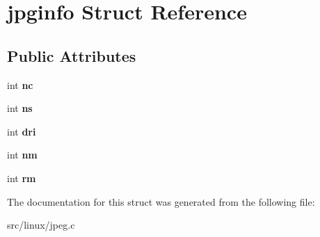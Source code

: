 \hypertarget{structjpginfo}{\section{jpginfo Struct Reference}
\label{structjpginfo}
}
\subsection*{Public Attributes}
\begin{DoxyCompactItemize}
\item 
\hypertarget{structjpginfo_a591a92da5251b01e7d4a77b7cf8de9a4}{int {\bfseries nc}}\label{structjpginfo_a591a92da5251b01e7d4a77b7cf8de9a4}

\item 
\hypertarget{structjpginfo_abd9691c1d18a5c9dbf731ba17b0ef345}{int {\bfseries ns}}\label{structjpginfo_abd9691c1d18a5c9dbf731ba17b0ef345}

\item 
\hypertarget{structjpginfo_aa91f749c3118de0e080c7f1bcd9322c4}{int {\bfseries dri}}\label{structjpginfo_aa91f749c3118de0e080c7f1bcd9322c4}

\item 
\hypertarget{structjpginfo_a6686c5a530ab2888cf5987cbefb0123a}{int {\bfseries nm}}\label{structjpginfo_a6686c5a530ab2888cf5987cbefb0123a}

\item 
\hypertarget{structjpginfo_a4b5fae8fa04eacd730eb6ebec7670ec8}{int {\bfseries rm}}\label{structjpginfo_a4b5fae8fa04eacd730eb6ebec7670ec8}

\end{DoxyCompactItemize}


The documentation for this struct was generated from the following file\-:\begin{DoxyCompactItemize}
\item 
src/linux/jpeg.\-c\end{DoxyCompactItemize}
